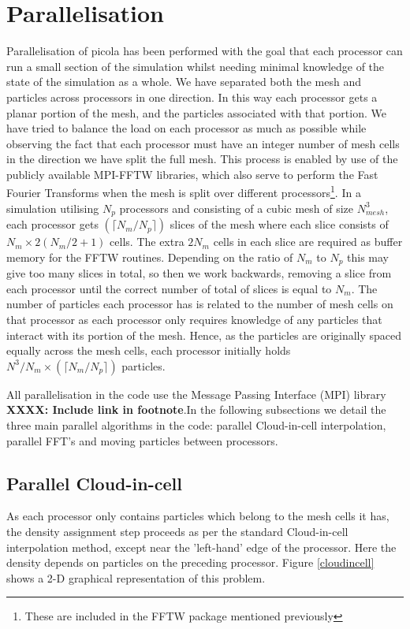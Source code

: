 \documentclass[5p,authoryear]{elsarticle}
\begin{document}
\section{Parallelisation}
Parallelisation of {\sc picola} has been performed with the goal that each processor can run a small section of the simulation whilst needing minimal knowledge of the state of the simulation as a whole. We have separated both the mesh and particles across processors in one direction. In this way each processor gets a planar portion of the mesh, and the particles associated with that portion. We have tried to balance the load on each processor as much as possible while observing the fact that each processor must have an integer number of mesh cells in the direction we have split the full mesh. This process is enabled by use of the publicly available MPI-FFTW libraries, which also serve to perform the Fast Fourier Transforms when the mesh is split over different processors\footnote{These are included in the FFTW package mentioned previously}. In a simulation utilising $N_{p}$ processors and consisting of a cubic mesh of size $N_{mesh}^{3}$, each processor gets $(\lceil N_{m}/N_{p} \rceil)$ slices of the mesh where each slice consists of $N_{m}\times 2(N_{m}/2+1)$ cells. The extra $2N_{m}$ cells in each slice are required as buffer memory for the FFTW routines. Depending on the ratio of $N_{m}$ to $N_{p}$ this may give too many slices in total, so then we work backwards, removing a slice from each processor until the correct number of total of slices is equal to $N_{m}$. The number of particles each processor has is related to the number of mesh cells on that processor as each processor only requires knowledge of any particles that interact with its portion of the mesh. Hence, as the particles are originally spaced equally across the mesh cells, each processor initially holds $N^{3}/N_{m}\times(\lceil N_{m}/N_{p} \rceil)$ particles.

All parallelisation in the code use the Message Passing Interface (MPI) library \textbf{XXXX: Include link in footnote}.In the following subsections we detail the three main parallel algorithms in the code: parallel Cloud-in-cell interpolation, parallel FFT's and moving particles between processors.

\subsection{Parallel Cloud-in-cell}

As each processor only contains particles which belong to the mesh cells it has, the density assignment step proceeds as per the standard Cloud-in-cell interpolation method, except near the 'left-hand' edge of the processor. Here the density depends on particles on the preceding processor. Figure \ref{cloudincell} shows a 2-D graphical representation of this problem.
\end{document}
